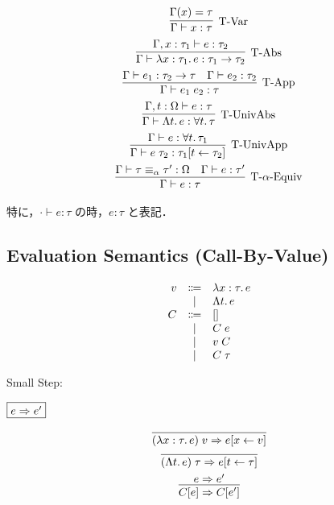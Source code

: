 \begin{gather*}
  \infer[\text{T-Var}]{\Gamma \vdash x: \tau}{
    \Gamma(x) = \tau
  }
  \\
  \infer[\text{T-Abs}]{\Gamma \vdash \lambda x: \tau_1\ldotp e: \tau_1 \to \tau_2}{
    \Gamma, x: \tau_1 \vdash e: \tau_2
  }
  \\
  \infer[\text{T-App}]{\Gamma \vdash e_1\; e_2: \tau}{
    \Gamma \vdash e_1: \tau_2 \to \tau
    &
    \Gamma \vdash e_2: \tau_2
  }
  \\
  \infer[\text{T-UnivAbs}]{\Gamma \vdash \Lambda t\ldotp e: \forall t\ldotp \tau}{
    \Gamma, t: \Omega \vdash e: \tau
  }
  \\
  \infer[\text{T-UnivApp}]{\Gamma \vdash e\; \tau_2: \tau_1[t \assign \tau_2]}{
    \Gamma \vdash e: \forall t\ldotp \tau_1
  }
  \\
  \infer[\text{T-$\alpha$-Equiv}]{\Gamma \vdash e: \tau}{
    \Gamma \vdash \tau \equiv_\alpha \tau': \Omega
    &
    \Gamma \vdash e: \tau'
  }
\end{gather*}

特に，$\cdot \vdash e: \tau$ の時，$e: \tau$ と表記．

\subsection{Evaluation Semantics (Call-By-Value)}

\begin{align*}
  \begin{array}{rcl}
  v
  & \Coloneq & \lambda x: \tau\ldotp e \\
  & \mid & \Lambda t\ldotp e \\
  C
  & \Coloneq & [] \\
  & \mid & C\; e \\
  & \mid & v\; C \\
  & \mid & C\; \tau
  \end{array}
\end{align*}

Small Step:

$\fbox{$e \Rightarrow e'$}$

\begin{gather*}
  \infer{(\lambda x: \tau\ldotp e)\; v \smalleval e[x \assign v]}{}
  \\
  \infer{(\Lambda t\ldotp e)\; \tau \smalleval e[t \assign \tau]}{}
  \\
  \infer{C[e] \smalleval C[e']}{
    e \smalleval e'
  }
\end{gather*}

